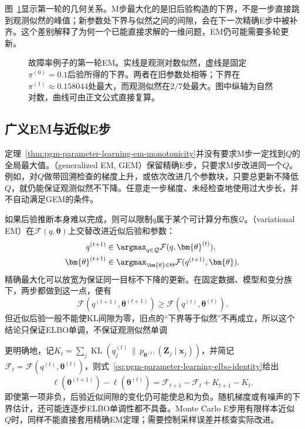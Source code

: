 图~\ref{fig:pgm-parameter-learning-em-bound}显示第一轮的几何关系。M步最大化的是旧后验构造的下界，不是一步直接跳到观测似然的峰值；新参数处下界与似然之间的间隙，会在下一次精确E步中被补齐。这个差别解释了为何一个已能直接求解的一维问题，EM仍可能需要多轮更新。

\begin{figure}[htbp]
  \centering
  
  \caption{故障率例子的第一轮EM。实线是观测对数似然，虚线是固定$\pi^{(0)}=0.1$后验所得的下界。两者在旧参数处相等；下界在$\pi^{(1)}\approx0.158044$处最大，而观测似然在$2/7$处最大。图中纵轴为自然对数，曲线可由正文公式直接复算。}
  \label{fig:pgm-parameter-learning-em-bound}
\end{figure}

\subsection{广义EM与近似E步}
\label{sec:pgm-parameter-learning-em-extensions}

定理~\ref{thm:pgm-parameter-learning-em-monotonicity}并没有要求M步一定找到$Q$的全局最大值。（generalized EM, GEM）保留精确E步，只要求M步改进同一个$Q$。例如，对$Q$做带回溯检查的梯度上升，或依次改进几个参数块，只要总更新不降低$Q$，就仍能保证观测似然不下降。任意走一步梯度、未经检查地使用过大步长，并不自动满足GEM的条件。

如果后验推断本身难以完成，则可以限制$q$属于某个可计算分布族$\mathcal{Q}$。（variational EM）在$\mathcal{F}(q,\bm{\theta})$上交替改进近似后验和参数：
\begin{equation}
  \begin{aligned}
    q^{(t+1)}
      &\in\argmax_{q\in\mathcal{Q}}\mathcal{F}(q,\bm{\theta}^{(t)}),\\
    \bm{\theta}^{(t+1)}
      &\in\argmax_{\bm{\theta}\in\Theta}
         \mathcal{F}(q^{(t+1)},\bm{\theta}).
  \end{aligned}
  \label{eq:pgm-parameter-learning-variational-em}
\end{equation}
精确最大化可以放宽为保证同一目标不下降的更新。在固定数据、模型和变分族下，两步都做到这一点，便有
\[
  \mathcal{F}(q^{(t+1)},\bm{\theta}^{(t+1)})
  \geq\mathcal{F}(q^{(t)},\bm{\theta}^{(t)}).
\]
但近似后验一般不能使KL间隙为零，旧点的“下界等于似然”不再成立，所以这个结论只保证ELBO单调，不保证观测似然单调

更明确地，记$K_t=\sum_j\operatorname{KL}(q_j^{(t)}\,\|\,p_{\bm{\theta}^{(t)}}(\bm{Z}_j\mid\bm{x}_j))$，并简记$\mathcal{F}_t=\mathcal{F}(q^{(t)},\bm{\theta}^{(t)})$，则式~\eqref{eq:pgm-parameter-learning-elbo-identity}给出
\[
  \ell(\bm{\theta}^{(t+1)})-\ell(\bm{\theta}^{(t)})
  =\mathcal{F}_{t+1}-\mathcal{F}_t+K_{t+1}-K_t.
\]
即使第一项非负，后验近似间隙的变化仍可能使总和为负。随机梯度或有噪声的下界估计，还可能连逐步ELBO单调性都不具备。Monte Carlo E步用有限样本近似$Q$时，同样不能直接套用精确EM定理；需要控制采样误差并核查实际改进。

